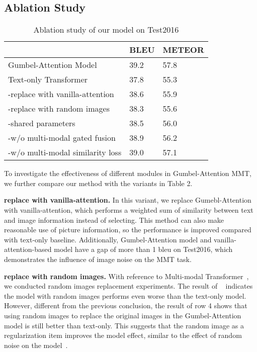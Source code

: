 \documentclass{article}
\begin{document}
\subsection{Ablation Study}

\begin{table}
\centering
\begin{tabular}{lll}
\hline
  &BLEU  & METEOR \\
\hline
Gumbel-Attention Model       & 39.2  & 57.8     \\
Text-only Transformer       & 37.8  & 55.3     \\
\midrule 
-replace with vanilla-attention       & 38.6  & 55.9      \\
-replace with random images   & 38.3  & 55.6     \\
-shared parameters  & 38.5  & 56.0     \\
-w/o multi-modal gated fusion   & 38.9  & 56.2     \\
-w/o multi-modal similarity loss   & 39.0  & 57.1     \\
\hline
\end{tabular}
\caption{Ablation study of our model on Test2016}
\label{tab:plain}
\end{table}


To investigate the effectiveness of different modules in Gumbel-Attention MMT, we further compare our method with the variants in Table 2.

\textbf{replace with vanilla-attention.} 
In this variant, we replace Gumebl-Attention with vanilla-attention, which performs a weighted sum of similarity between text and image information instead of selecting. This method can also make reasonable use of picture information, so the performance is improved compared with text-only baseline. Additionally, Gumbel-Attention model and vanilla-attention-based model have a gap of more than 1 bleu on Test2016, which demonstrates the influence of image noise on the MMT task.




\textbf{replace with random images.}
With reference to Multi-modal Transformer~\cite{DBLP:conf/acl/YaoW20}, we conducted random images replacement experiments. The result of ~\cite{DBLP:conf/acl/YaoW20} indicates the model with random images performs even worse than the text-only model. However, different from the previous conclusion, the result of row 4 shows that using random images to replace the original images in the Gumbel-Attention model is still better than text-only. This suggests that the random image as a regularization item improves the model effect, similar to the effect of random noise on the model~\cite{DBLP:journals/neco/Bishop95}.
\end{document}
